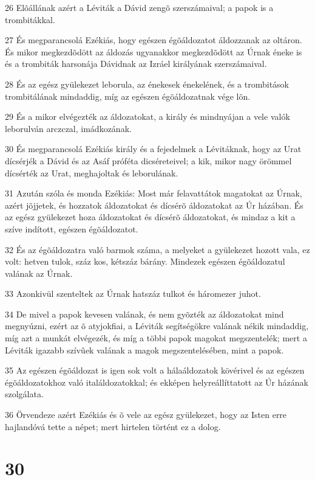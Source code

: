 \par 26 Elõállának azért a Léviták a Dávid zengõ szerszámaival; a papok is a trombitákkal.
\par 27 És megparancsolá Ezékiás, hogy egészen égõáldozatot áldozzanak az oltáron. És mikor megkezdõdött az áldozás ugyanakkor megkezdõdött az Úrnak éneke is és a trombiták harsonája Dávidnak az Izráel királyának szerszámaival.
\par 28 És az egész gyülekezet leborula, az énekesek énekelének, és a trombitások trombitálának mindaddig, míg az egészen égõáldozatnak vége lõn.
\par 29 És a mikor elvégezték az áldozatokat, a király és mindnyájan a vele valók leborulván arczczal, imádkozának.
\par 30 És megparancsolá Ezékiás király és a fejedelmek a Lévitáknak, hogy az Urat dícsérjék a Dávid és az Asáf próféta dicséreteivel; a kik, mikor nagy örömmel dícsérték az Urat, meghajoltak és leborulának.
\par 31 Azután szóla és monda Ezékiás: Most már felavattátok magatokat az Úrnak, azért jõjjetek, és hozzatok áldozatokat és dícsérõ áldozatokat az Úr házában. És az egész gyülekezet hoza áldozatokat és dícsérõ áldozatokat, és mindaz a kit a szíve indított, egészen égõáldozatot.
\par 32 És az égõáldozatra való barmok száma, a melyeket a gyülekezet hozott vala, ez volt: hetven tulok, száz kos, kétszáz bárány. Mindezek egészen égõáldozatul valának az Úrnak.
\par 33 Azonkivül szenteltek az Úrnak hatszáz tulkot és háromezer juhot.
\par 34 De mivel a papok kevesen valának, és nem gyõzték az áldozatokat mind megnyúzni, ezért az õ atyjokfiai, a Léviták segítségökre valának nékik mindaddig, míg azt a munkát elvégezék, és míg a többi papok magokat megszentelék; mert a Léviták igazabb szívûek valának a magok megszentelésében, mint a papok.
\par 35 Az egészen égõáldozat is igen sok volt a hálaáldozatok kövérivel és az egészen égõáldozatokhoz való italáldozatokkal; és ekképen helyreállíttatott az Úr házának szolgálata.
\par 36 Örvendeze azért Ezékiás és õ vele az egész gyülekezet, hogy az Isten erre hajlandóvá tette a népet; mert hirtelen történt ez a dolog.

\chapter{30}

